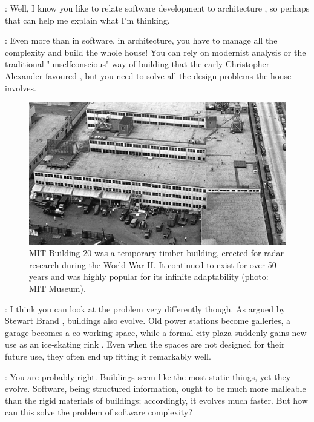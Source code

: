 \documentclass[runningheads]{llncs}
\newcommand{\T}{Tomas}
\newcommand{\J}{Joel}
\newcommand{\says}[2][gg]{\vspace{0.5em}\noindent\hangindent=0.5cm{\textsc{#1}}: #2}
\begin{document}
\says[\J]{Well, I know you like to relate software development to architecture \cite{petricek-2021-architecture}, so perhaps that can help me explain what I'm thinking.}

\says[\T]{Even more than in software, in architecture, you have to manage all the complexity and build the whole house! You can rely on modernist analysis or the traditional "unselfconscious" way of building that the early Christopher Alexander favoured \cite{alexander-1964-notes}, but you need to solve all the design problems the house involves.}

\begin{figure}[t]
\centering
\includegraphics[scale=0.33]{figures/mit20.jpg}
\caption{MIT Building 20 was a temporary timber building, erected for radar research during the World War II. It continued to exist for over 50 years and was highly popular for its infinite
adaptability \cite{brand-1994-buildings} (photo: MIT Museum).}
\label{fig:mit20}
\end{figure}

\says[\J]{I think you can look at the problem very differently though. As argued by Stewart Brand \cite{brand-1994-buildings}, buildings also evolve. Old power stations become galleries, a garage becomes a co-working space, while a formal city plaza suddenly gains new use as an ice-skating rink \cite{cohen-1974-context}. Even when the spaces are not designed for their future use, they often end up fitting it remarkably well.}

\says[\T]{You are probably right. Buildings seem like the most static things, yet they evolve. Software, being structured information, ought to be much more malleable than the rigid materials of buildings; accordingly, it evolves much faster. But how can this solve the problem of software complexity?}
\end{document}
